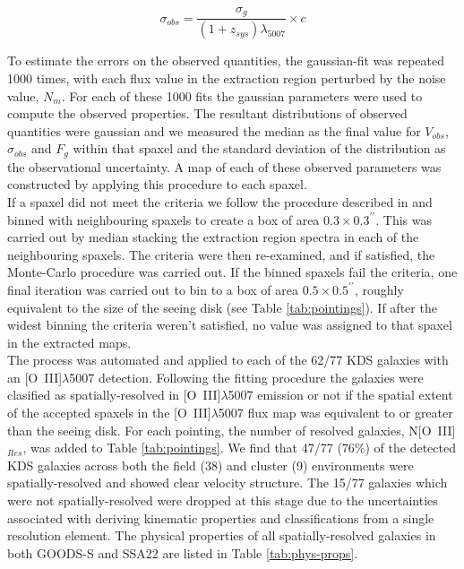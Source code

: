 \documentclass[fleqn,usenatbib]{mnras}
\begin{document}
\begin{equation}\label{eq:dispersion_comp}
   \sigma_{obs} = \frac{\sigma_{g}}{(1 + z_{sys})\lambda_{5007}} \times c
\end{equation}

To estimate the errors on the observed quantities, the gaussian-fit was repeated 1000 times, with each flux value in the extraction region perturbed by the noise value, $N_{m}$.
For each of these 1000 fits the gaussian parameters were used to compute the observed properties.
The resultant distributions of observed quantities were gaussian and we measured the median as the final value for $V_{obs}$, $\sigma_{obs}$ and $F_{g}$ within that spaxel and the standard deviation of the distribution as the observational uncertainty.
A map of each of these observed parameters was constructed by applying this procedure to each spaxel. \\

If a spaxel did not meet the criteria we follow the procedure described in \cite{Stott2016} and binned with neighbouring spaxels to create a box of area $0.3\times0.3^{\prime\prime}$.
This was carried out by median stacking the extraction region spectra in each of the neighbouring spaxels.
The criteria were then re-examined, and if satisfied, the Monte-Carlo procedure was carried out. 
If the binned spaxels fail the criteria, one final iteration was carried out to bin to a box of area $0.5\times0.5^{\prime\prime}$, roughly equivalent to the size of the seeing disk (see Table \ref{tab:pointings}).
If after the widest binning the criteria weren't satisfied, no value was assigned to that spaxel in the extracted maps. \\

The process was automated and applied to each of the 62/77 KDS galaxies with an [O~{\sc III}]$\lambda$5007 detection.
Following the fitting procedure the galaxies were clasified as spatially-resolved in [O~{\sc III}]$\lambda$5007 emission or not if the spatial extent of the accepted spaxels in the [O~{\sc III}]$\lambda$5007 flux map was equivalent to or greater than the seeing disk.
For each pointing, the number of resolved galaxies, N[O~{\sc III}]$_{Res}$, was added to Table \ref{tab:pointings}.
We find that 47/77 (76\%) of the detected KDS galaxies across both the field (38) and cluster (9) environments were spatially-resolved and showed clear velocity structure.
The 15/77 galaxies which were not spatially-resolved were dropped at this stage due to the uncertainties associated with deriving kinematic properties and classifications from a single resolution element.
The physical properties of all spatially-resolved galaxies in both GOODS-S and SSA22 are listed in Table \ref{tab:phys-props}. \\ 
\end{document}
